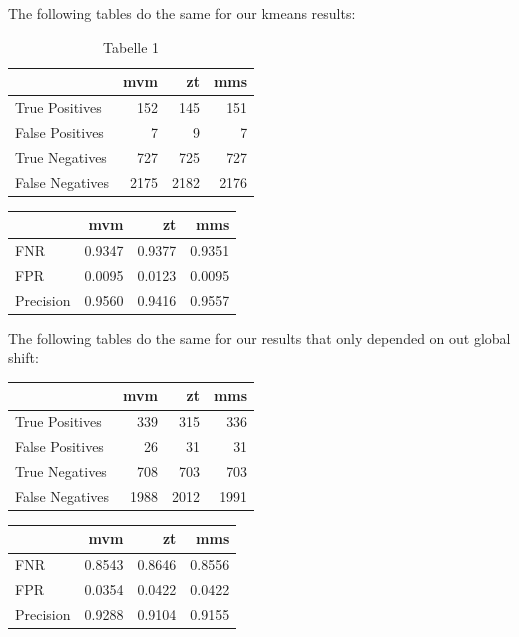 \documentclass[
  12pt,
]{article}
\begin{document}
The following tables do the same for our kmeans results:

\begin{table}

\caption{\label{tab:unnamed-chunk-7}Tabelle 1}
\centering
\begin{tabular}[t]{l|r|r|r}
\hline
  & mvm & zt & mms\\
\hline
True Positives & 152 & 145 & 151\\
\hline
False Positives & 7 & 9 & 7\\
\hline
True Negatives & 727 & 725 & 727\\
\hline
False Negatives & 2175 & 2182 & 2176\\
\hline
\end{tabular}
\end{table}

\begin{table}
\centering
\begin{tabular}{l|r|r|r}
\hline
  & mvm & zt & mms\\
\hline
FNR & 0.9347 & 0.9377 & 0.9351\\
\hline
FPR & 0.0095 & 0.0123 & 0.0095\\
\hline
Precision & 0.9560 & 0.9416 & 0.9557\\
\hline
\end{tabular}
\end{table}

The following tables do the same for our results that only depended on
out global shift:

\begin{table}
\centering
\begin{tabular}{l|r|r|r}
\hline
  & mvm & zt & mms\\
\hline
True Positives & 339 & 315 & 336\\
\hline
False Positives & 26 & 31 & 31\\
\hline
True Negatives & 708 & 703 & 703\\
\hline
False Negatives & 1988 & 2012 & 1991\\
\hline
\end{tabular}
\end{table}

\begin{table}
\centering
\begin{tabular}{l|r|r|r}
\hline
  & mvm & zt & mms\\
\hline
FNR & 0.8543 & 0.8646 & 0.8556\\
\hline
FPR & 0.0354 & 0.0422 & 0.0422\\
\hline
Precision & 0.9288 & 0.9104 & 0.9155\\
\hline
\end{tabular}
\end{table}
\end{document}
